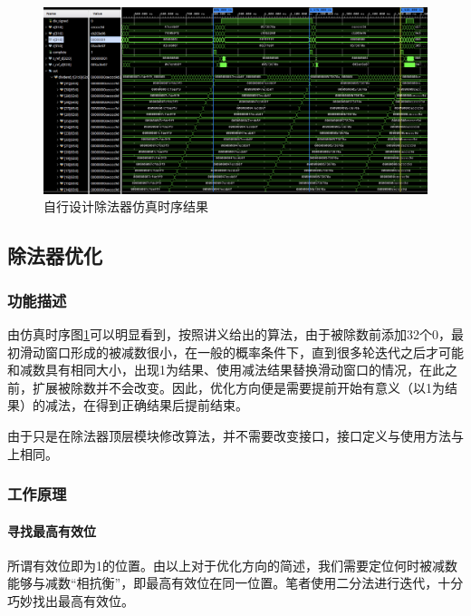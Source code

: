 \documentclass[UTF-8,twoside,c5size]{ctexart}
\begin{document}
	\begin{figure}[!h]
		\centering
		\includegraphics[width=1\linewidth]{figures/div_DIY.png}
		\caption{自行设计除法器仿真时序结果}
		\label{fig:divdiy}
	\end{figure}

	\subsection{除法器优化}
	
	\subsubsection{功能描述}
	
	由仿真时序图\ref{fig:divdiy}可以明显看到，按照讲义给出的算法，由于被除数前添加32个0，最初滑动窗口形成的被减数很小，在一般的概率条件下，直到很多轮迭代之后才可能和减数具有相同大小，出现1为结果、使用减法结果替换滑动窗口的情况，在此之前，扩展被除数并不会改变。因此，优化方向便是需要提前开始有意义（以1为结果）的减法，在得到正确结果后提前结束。
	
	由于只是在除法器顶层模块修改算法，并不需要改变接口，接口定义与使用方法与上相同。
	
	\subsubsection{工作原理}
	
	\paragraph{寻找最高有效位}\hfill
	
	所谓有效位即为1的位置。由以上对于优化方向的简述，我们需要定位何时被减数能够与减数“相抗衡”，即最高有效位在同一位置。笔者使用二分法进行迭代，十分巧妙找出最高有效位。
	
\end{document}
